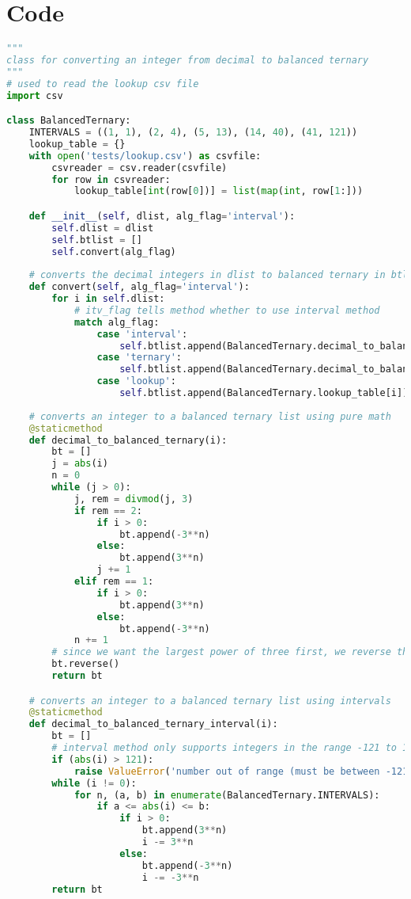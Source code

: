\documentclass[12pt]{report}
\begin{document}
\chapter{Code}
\begin{lstlisting}[language=Python, caption=balanced\_ternary.py]
"""
class for converting an integer from decimal to balanced ternary
"""
# used to read the lookup csv file
import csv

class BalancedTernary:
    INTERVALS = ((1, 1), (2, 4), (5, 13), (14, 40), (41, 121))
    lookup_table = {}
    with open('tests/lookup.csv') as csvfile:
        csvreader = csv.reader(csvfile)
        for row in csvreader:
            lookup_table[int(row[0])] = list(map(int, row[1:]))

    def __init__(self, dlist, alg_flag='interval'):
        self.dlist = dlist
        self.btlist = []
        self.convert(alg_flag)
    
    # converts the decimal integers in dlist to balanced ternary in btlist
    def convert(self, alg_flag='interval'):
        for i in self.dlist:
            # itv_flag tells method whether to use interval method
            match alg_flag:
                case 'interval':
                    self.btlist.append(BalancedTernary.decimal_to_balanced_ternary_interval(i))
                case 'ternary':
                    self.btlist.append(BalancedTernary.decimal_to_balanced_ternary(i))
                case 'lookup':
                    self.btlist.append(BalancedTernary.lookup_table[i])
    
    # converts an integer to a balanced ternary list using pure math
    @staticmethod
    def decimal_to_balanced_ternary(i):
        bt = []
        j = abs(i)
        n = 0
        while (j > 0):
            j, rem = divmod(j, 3)
            if rem == 2:
                if i > 0:
                    bt.append(-3**n)
                else:
                    bt.append(3**n)
                j += 1
            elif rem == 1:
                if i > 0:
                    bt.append(3**n)
                else:
                    bt.append(-3**n)
            n += 1
        # since we want the largest power of three first, we reverse the order
        bt.reverse()
        return bt

    # converts an integer to a balanced ternary list using intervals
    @staticmethod
    def decimal_to_balanced_ternary_interval(i):
        bt = []
        # interval method only supports integers in the range -121 to 121
        if (abs(i) > 121):
            raise ValueError('number out of range (must be between -121 and 121)')
        while (i != 0):
            for n, (a, b) in enumerate(BalancedTernary.INTERVALS):
                if a <= abs(i) <= b:
                    if i > 0:
                        bt.append(3**n)
                        i -= 3**n
                    else:
                        bt.append(-3**n)
                        i -= -3**n
        return bt


\end{lstlisting}
\end{document}
